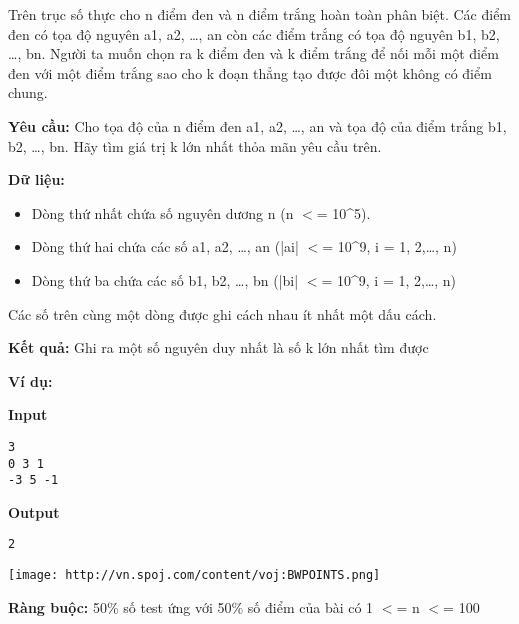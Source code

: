 

Trên trục số thực cho n điểm đen và n điểm trắng hoàn toàn phân biệt. Các điểm đen có tọa độ nguyên a1, a2, …, an còn các điểm trắng có tọa độ nguyên b1, b2, …, bn. Người ta muốn chọn ra k điểm đen và k điểm trắng để nối mỗi một điểm đen với một điểm trắng sao cho k đoạn thẳng tạo được đôi một không có điểm chung.

\textbf{Yêu cầu: } Cho tọa độ của n điểm đen a1, a2, …, an và tọa độ của điểm trắng b1, b2, …, bn. Hãy tìm giá trị k lớn nhất thỏa mãn yêu cầu trên.

\textbf{Dữ liệu: }
\begin{itemize}
	\item Dòng thứ nhất chứa số nguyên dương n (n $<$= 10\textasciicircum5).
	\item Dòng thứ hai chứa các số a1, a2, …, an (|ai| $<$= 10\textasciicircum9, i = 1, 2,…, n)
	\item Dòng thứ ba chứa các số b1, b2, …, bn (|bi| $<$= 10\textasciicircum9, i = 1, 2,…, n)
\end{itemize}

Các số trên cùng một dòng được ghi cách nhau ít nhất một dấu cách.

\textbf{Kết quả: } Ghi ra một số nguyên duy nhất là số k lớn nhất tìm được

\textbf{Ví dụ: }

\textbf{Input}
\begin{verbatim}
3
0 3 1
-3 5 -1\end{verbatim}

\textbf{Output}
\begin{verbatim}
2\end{verbatim}


\texttt{[image: http://vn.spoj.com/content/voj:BWPOINTS.png]}

\textbf{Ràng buộc: } 50\% số test ứng với 50\% số điểm của bài có 1 $<$= n $<$= 100